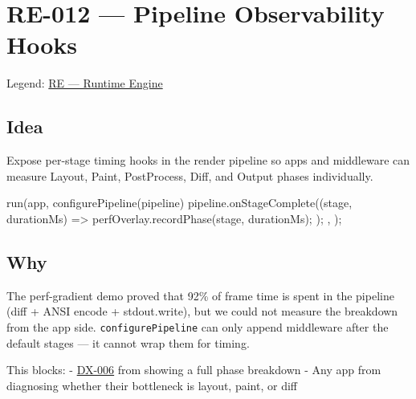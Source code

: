 \chapter{RE-012 --- Pipeline Observability Hooks}\label{record-363}

\smallskip

Legend: \href{https://github.com/flyingrobots/bijou/blob/cbd70612140e7a450d764b3c7be1c6af878b99bc/docs/method/graveyard/legends/RE-runtime-engine.md}{RE --- Runtime Engine}

\section{Idea}\label{record-363-idea}

Expose per-stage timing hooks in the render pipeline so apps and middleware can measure Layout, Paint, PostProcess, Diff, and Output phases individually.

\begin{CodeBlock}
run(app, {
  configurePipeline(pipeline) {
    pipeline.onStageComplete((stage, durationMs) => {
      perfOverlay.recordPhase(stage, durationMs);
    });
  },
});
\end{CodeBlock}

\section{Why}\label{record-363-why}

The perf-gradient demo proved that 92\% of frame time is spent in the pipeline (diff + ANSI encode + stdout.write), but we could not measure the breakdown from the app side. \texttt{c\allowbreak{}o\allowbreak{}n\allowbreak{}f\allowbreak{}i\allowbreak{}g\allowbreak{}u\allowbreak{}r\allowbreak{}e\allowbreak{}P\allowbreak{}i\allowbreak{}p\allowbreak{}e\allowbreak{}l\allowbreak{}i\allowbreak{}n\allowbreak{}e} can only append middleware after the default stages --- it cannot wrap them for timing.

This blocks: - \href{https://github.com/flyingrobots/bijou/blob/cbd70612140e7a450d764b3c7be1c6af878b99bc/docs/method/graveyard/legacy-backlog/cool-ideas/DX-006-debug-performance-overlay-component.md}{DX-006} from showing a full phase breakdown - Any app from diagnosing whether their bottleneck is layout, paint, or diff

